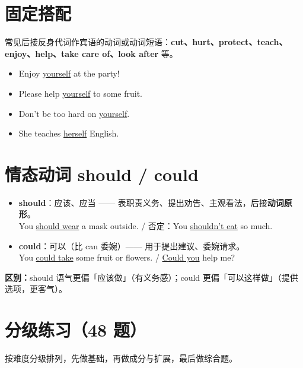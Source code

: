 \documentclass[11pt,a4paper]{ctexart}
\begin{document}
\section{固定搭配}
常见后接反身代词作宾语的动词或动词短语：\textbf{cut、hurt、protect、teach、enjoy、help、take care of、look after} 等。
\begin{itemize}[leftmargin=1.4em]
\item Enjoy \underline{yourself} at the party!
\item Please help \underline{yourself} to some fruit.
\item Don't be too hard on \underline{yourself}.
\item She teaches \underline{herself} English.
\end{itemize}

\section{情态动词 should / could}
\begin{itemize}[leftmargin=1.4em]
\item \textbf{should}：应该、应当 —— 表职责义务、提出劝告、主观看法，后接\textbf{动词原形}。\\
You \underline{should wear} a mask outside. / 否定：You \underline{shouldn't eat} so much.
\item \textbf{could}：可以（比 can 委婉）—— 用于提出建议、委婉请求。\\
You \underline{could take} some fruit or flowers. / \underline{Could you} help me?
\end{itemize}
\textbf{区别：}should 语气更偏「应该做」（有义务感）；could 更偏「可以这样做」（提供选项，更客气）。


\newpage
\section{分级练习（48 题）}
\noindent 按难度分级排列，先做基础，再做成分与扩展，最后做综合题。
\end{document}
